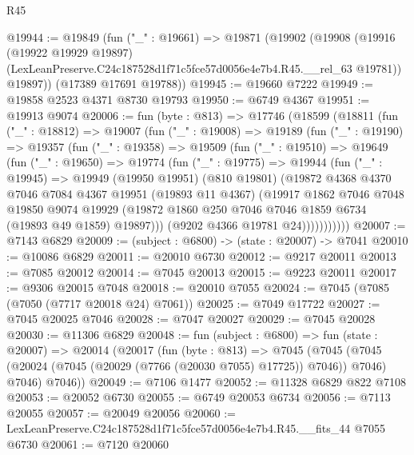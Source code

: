 \begin{lexlean}{R45}
\begin{coremodule}
{@19944 := @19849
    (fun ("_" : @19661) =>
    @19871
      (@19902
        (@19908
          (@19916
            (@19922 @19929 @19897)
            (LexLeanPreserve.C24c187528d1f71c5fce57d0056e4e7b4.R45.__rel_63 @19781))
          @19897))
      (@17389 @17691 @19788))
@19945 := @19660 @7222
@19949 := @19858 @2523 @4371 @8730 @19793
@19950 := @6749 @4367
@19951 := @19913 @9074
@20006 := fun (byte : @813) =>
  @17746
    (@18599
      (@18811
        (fun ("_" : @18812) =>
        @19007
          (fun ("_" : @19008) =>
          @19189
            (fun ("_" : @19190) =>
            @19357
              (fun ("_" : @19358) =>
              @19509
                (fun ("_" : @19510) =>
                @19649
                  (fun ("_" : @19650) =>
                  @19774
                    (fun ("_" : @19775) =>
                    @19944
                      (fun ("_" : @19945) =>
                      @19949
                        (@19950 @19951)
                        (@810 @19801)
                        (@19872
                          @4368
                          @4370
                          @7046
                          @7084
                          @4367
                          @19951
                          (@19893 @11 @4367)
                          (@19917
                            @1862
                            @7046
                            @7048
                            @19850
                            @9074
                            @19929
                            (@19872 @1860 @250 @7046 @7046 @1859 @6734 (@19893 @49 @1859) @19897)))
                        (@9202 @4366 @19781 @24)))))))))))
@20007 := @7143 @6829
@20009 := (subject : @6800) -> (state : @20007) -> @7041
@20010 := @10086 @6829
@20011 := @20010 @6730
@20012 := @9217 @20011
@20013 := @7085 @20012
@20014 := @7045 @20013
@20015 := @9223 @20011
@20017 := @9306 @20015 @7048
@20018 := @20010 @7055
@20024 := @7045 (@7085 (@7050 (@7717 @20018 @24) @7061))
@20025 := @7049 @17722
@20027 := @7045 @20025 @7046
@20028 := @7047 @20027
@20029 := @7045 @20028
@20030 := @11306 @6829
@20048 := fun (subject : @6800) =>
  fun (state : @20007) =>
  @20014
    (@20017
      (fun (byte : @813) =>
      @7045
        (@7045 (@7045 (@20024 (@7045 (@20029 (@7766 (@20030 @7055) @17725)) @7046)) @7046) @7046)
        @7046))
@20049 := @7106 @1477
@20052 := @11328 @6829 @822 @7108
@20053 := @20052 @6730
@20055 := @6749 @20053 @6734
@20056 := @7113 @20055
@20057 := @20049 @20056
@20060 := LexLeanPreserve.C24c187528d1f71c5fce57d0056e4e7b4.R45.__fits_44 @7055 @6730
@20061 := @7120 @20060
}
\end{coremodule}
\end{lexlean}

